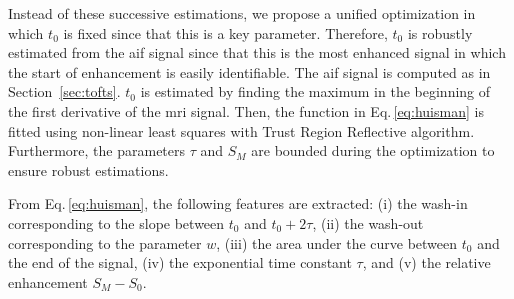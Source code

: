 Instead of these successive estimations, we propose a unified optimization in which $t_0$ is fixed since that this is a key parameter.
Therefore, $t_0$ is robustly estimated from the \ac{aif} signal since that this is the most enhanced signal in which the start of enhancement is easily identifiable.
The \ac{aif} signal is computed as in Section~\ref{sec:tofts}.
$t_0$ is estimated by finding the maximum in the beginning of the first derivative of the \ac{mri} signal.
Then, the function in Eq.\,\eqref{eq:huisman} is fitted using non-linear least squares with Trust Region Reflective algorithm.
Furthermore, the parameters $\tau$ and $S_M$ are bounded during the optimization to ensure robust estimations.

From Eq.\,\eqref{eq:huisman}, the following features are extracted:
(i) the wash-in corresponding to the slope between $t_0$ and $t_0 + 2 \tau$,
(ii) the wash-out corresponding to the parameter $w$,
(iii) the area under the curve between $t_0$ and the end of the signal,
(iv) the exponential time constant $\tau$, and
(v) the relative enhancement $S_M - S_0$.


